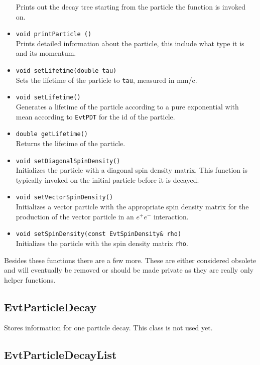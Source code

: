 \begin{itemize}
      Prints out the decay tree starting from the particle the function is
      invoked on.
\item {\tt void printParticle ()}\\
      Prints detailed information about the particle, this include what type it
      is and its momentum.
\item {\tt void setLifetime(double tau)}\\
      Sets the lifetime of the particle to {\tt tau}, measured in mm/c.
\item {\tt void setLifetime()}\\
      Generates a lifetime of the particle according to a pure exponential with mean
      according to {\tt EvtPDT} for the id of the particle.
\item {\tt double getLifetime()}\\
      Returns the lifetime of the particle.
\item {\tt void setDiagonalSpinDensity()}\\
      Initializes the particle with a diagonal spin density matrix. This function
      is typically invoked on the initial particle before it is decayed.
\item {\tt void setVectorSpinDensity()}\\
      Initializes a vector particle with the appropriate spin density matrix for
      the production of the vector particle in an $e^+e^-$ interaction.
\item {\tt void setSpinDensity(const EvtSpinDensity\& rho)}\\
      Initializes the particle with the spin density matrix {\tt rho}.
\end{itemize}

Besides these functions there are a few more. These are either considered obsolete
and will eventually be removed or should be made private as they are really
only helper functions.

\subsection{EvtParticleDecay}

Stores information for one particle decay. This class is not used yet.


\subsection{EvtParticleDecayList}

